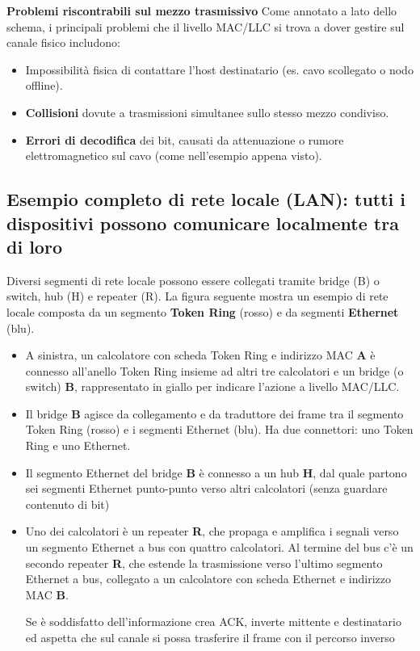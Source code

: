 \documentclass[a4paper,12pt]{report}
\begin{document}
\begin{notebox}{\textbf{Problemi riscontrabili sul mezzo trasmissivo}}
Come annotato a lato dello schema, i principali problemi che il livello MAC/LLC si trova a dover gestire sul canale fisico includono:
\begin{itemize}
    \item Impossibilità fisica di contattare l'host destinatario (es. cavo scollegato o nodo offline).
    \item \textbf{Collisioni} dovute a trasmissioni simultanee sullo stesso mezzo condiviso.
    \item \textbf{Errori di decodifica} dei bit, causati da attenuazione o rumore elettromagnetico sul cavo (come nell'esempio appena visto).
\end{itemize}
\end{notebox}






\newpage
\subsection{Esempio completo di rete locale (LAN): tutti i dispositivi possono comunicare localmente tra di loro}

Diversi segmenti di rete locale possono essere collegati tramite bridge (B) o switch, hub (H) e repeater (R).  
La figura seguente mostra un esempio di rete locale composta da un segmento \textbf{Token Ring} (rosso) e da segmenti \textbf{Ethernet} (blu).

\begin{itemize}
    \item A sinistra, un calcolatore con scheda Token Ring e indirizzo MAC \textbf{A} è connesso all’anello Token Ring insieme ad altri tre calcolatori e un bridge (o switch) \textbf{B}, rappresentato in giallo per indicare l’azione a livello MAC/LLC.
    \item Il bridge \textbf{B} agisce da collegamento e da traduttore dei frame tra il segmento Token Ring (rosso) e i segmenti Ethernet (blu). Ha due connettori: uno Token Ring e uno Ethernet.
    \item Il segmento Ethernet del bridge \textbf{B} è connesso a un hub \textbf{H}, dal quale partono sei segmenti Ethernet punto-punto verso altri calcolatori (senza guardare contenuto di bit)
    \item Uno dei calcolatori è un repeater \textbf{R}, che propaga e amplifica i segnali verso un segmento Ethernet a bus con quattro calcolatori. Al termine del bus c’è un secondo repeater \textbf{R}, che estende la trasmissione verso l’ultimo segmento Ethernet a bus, collegato a un calcolatore con scheda Ethernet e indirizzo MAC \textbf{B}. 
    
    Se è soddisfatto dell'informazione crea ACK, inverte mittente e destinatario ed aspetta che sul canale si possa trasferire il frame con il percorso inverso
\end{itemize}
\end{document}

